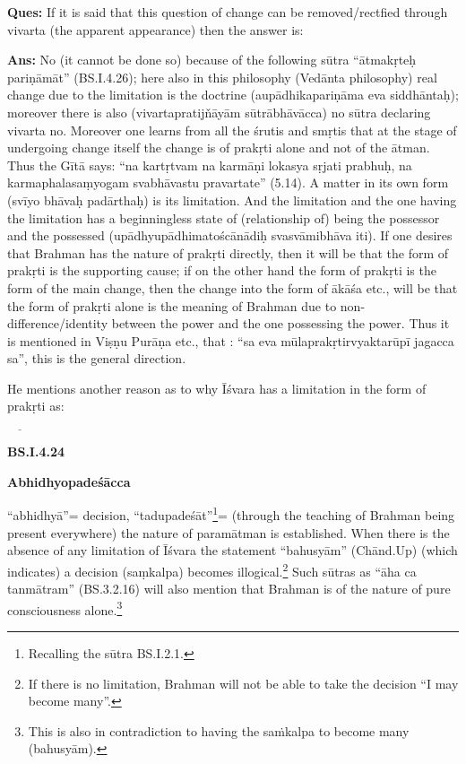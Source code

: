 \textbf{Ques:} If it is said that this question of change can be removed/rectfied  through vivarta (the apparent appearance) then the answer is:

\textbf{Ans:} No (it cannot be done so) because of the following sūtra “ātmakṛteḥ pariṇāmāt” (BS.I.4.26); here also in this philosophy (Vedānta philosophy) real change due to the limitation is the doctrine (aupādhikapariṇāma eva siddhāntaḥ); moreover there is also (vivartapratijňāyām sūtrābhāvācca) no sūtra declaring vivarta no. Moreover one learns from all the śrutis and smṛtis that at the stage of undergoing change itself the change is of prakṛti alone and not of the ātman. Thus the Gītā says: “na kartṛtvam na karmāṇi lokasya sṛjati prabhuḥ, na karmaphalasaṃyogam svabhāvastu pravartate” (5.14). A matter in its own form (svīyo bhāvaḥ padārthaḥ) is its limitation. And the limitation and the one having the limitation has a beginningless state of (relationship of) being the possessor and the possessed  (upādhyupādhimatoścānādiḥ svasvāmibhāva iti). If one desires that Brahman has the nature of prakṛti directly, then it will be that the form of prakṛti is the supporting cause; if on the other hand the form of prakṛti is the form of the main change, then the change into the form of ākāśa etc., will be that the form of prakṛti alone is the meaning of Brahman due to non-difference/identity between the power and the one possessing the power. Thus it is mentioned in Viṣṇu Purāṇa etc., that : “sa eva mūlaprakṛtirvyaktarūpī jagacca sa”, this is the general direction.

He mentions another reason as to why Īśvara has a limitation in the form of prakṛti as: 

\textbf{}


 $\underline{\qquad}$

\textbf{BS.I.4.24}

\textbf{Abhidhyopadeśācca}

“abhidhyā”= decision, “tadupadeśāt”\footnote{Recalling the sūtra BS.I.2.1.}= (through the teaching of Brahman being present everywhere) the nature of paramātman is established. When there is the absence of any limitation of Īśvara the statement “bahusyām” (Chānd.Up) (which indicates) a decision (saṃkalpa) becomes illogical.\footnote{If there is no limitation, Brahman will not be able to take the decision “I may become many”.} Such sūtras as “āha ca tanmātram” (BS.3.2.16) will also mention that Brahman is of the nature of pure consciousness alone.\footnote{This is also in contradiction to having the saṁkalpa to become many (bahusyām).}

